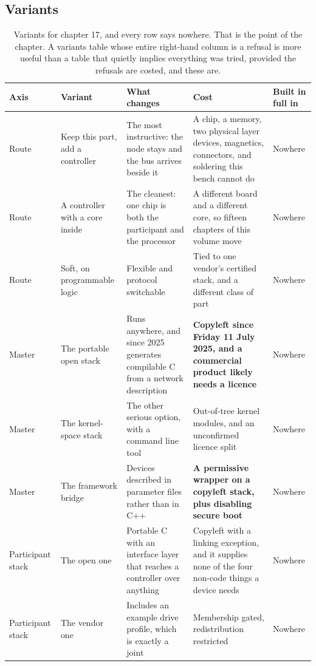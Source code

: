 \subsection*{Variants}

\begin{table}[H]\centering\small
\begin{tabular}{p{24mm}p{26mm}p{44mm}p{22mm}p{20mm}}
\toprule
Axis & Variant & What changes & Cost & Built in full in \\
\midrule
Route & Keep this part, add a controller & The most instructive: the node stays and the bus arrives beside it & A chip, a memory, two physical layer devices, magnetics, connectors, and soldering this bench cannot do & Nowhere \\
Route & A controller with a core inside & The cleanest: one chip is both the participant and the processor & A different board and a different core, so fifteen chapters of this volume move & Nowhere \\
Route & Soft, on programmable logic & Flexible and protocol switchable & Tied to one vendor's certified stack, and a different class of part & Nowhere \\
Master & The portable open stack & Runs anywhere, and since 2025 generates compilable C from a network description & \textbf{Copyleft since Friday 11 July 2025, and a commercial product likely needs a licence} & Nowhere \\
Master & The kernel-space stack & The other serious option, with a command line tool & Out-of-tree kernel modules, and an unconfirmed licence split & Nowhere \\
Master & The framework bridge & Devices described in parameter files rather than in C++ & \textbf{A permissive wrapper on a copyleft stack, plus disabling secure boot} & Nowhere \\
Participant stack & The open one & Portable C with an interface layer that reaches a controller over anything & Copyleft with a linking exception, and it supplies none of the four non-code things a device needs & Nowhere \\
Participant stack & The vendor one & Includes an example drive profile, which is exactly a joint & Membership gated, redistribution restricted & Nowhere \\
\bottomrule
\end{tabular}
\caption{Variants for chapter 17, and every row says nowhere. That is the point of the chapter. A variants table whose entire right-hand column is a refusal is more useful than a table that quietly implies everything was tried, provided the refusals are costed, and these are.}
\end{table}

